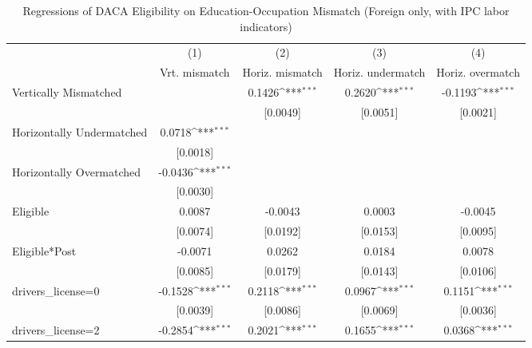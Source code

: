 \begin{table}[htbp]\centering
\def\sym#1{\ifmmode^{#1}\else\(^{#1}\)\fi}
\caption{Regressions of DACA Eligibility on Education-Occupation Mismatch (Foreign only, with IPC labor indicators)}
\begin{tabular}{l*{4}{c}}
\toprule
                    &\multicolumn{1}{c}{(1)}         &\multicolumn{1}{c}{(2)}         &\multicolumn{1}{c}{(3)}         &\multicolumn{1}{c}{(4)}         \\
                    &Vrt. mismatch         &Horiz. mismatch         &Horiz. undermatch         &Horiz. overmatch         \\
\midrule
Vertically Mismatched&                     &      0.1426\sym{***}&      0.2620\sym{***}&     -0.1193\sym{***}\\
                    &                     &    [0.0049]         &    [0.0051]         &    [0.0021]         \\
\addlinespace
Horizontally Undermatched&      0.0718\sym{***}&                     &                     &                     \\
                    &    [0.0018]         &                     &                     &                     \\
\addlinespace
Horizontally Overmatched&     -0.0436\sym{***}&                     &                     &                     \\
                    &    [0.0030]         &                     &                     &                     \\
\addlinespace
Eligible            &      0.0087         &     -0.0043         &      0.0003         &     -0.0045         \\
                    &    [0.0074]         &    [0.0192]         &    [0.0153]         &    [0.0095]         \\
\addlinespace
Eligible*Post       &     -0.0071         &      0.0262         &      0.0184         &      0.0078         \\
                    &    [0.0085]         &    [0.0179]         &    [0.0143]         &    [0.0106]         \\
\addlinespace
drivers\_license=0   &     -0.1528\sym{***}&      0.2118\sym{***}&      0.0967\sym{***}&      0.1151\sym{***}\\
                    &    [0.0039]         &    [0.0086]         &    [0.0069]         &    [0.0036]         \\
\addlinespace
drivers\_license=2   &     -0.2854\sym{***}&      0.2021\sym{***}&      0.1655\sym{***}&      0.0368\sym{***}\\

\end{tabular}
\end{table}
